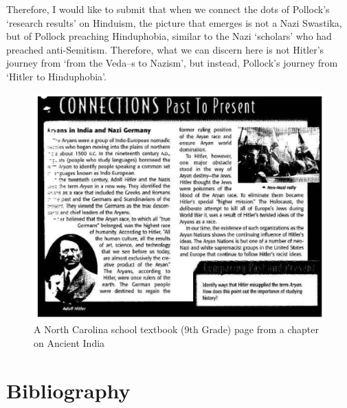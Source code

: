 Therefore, I would like to submit that when we connect the dots of Pollock’s ‘research results’ on Hinduism, the picture that emerges is not a Nazi Swastika, but of Pollock preaching Hinduphobia, similar to the Nazi ‘scholars’ who had preached anti-Semitism. Therefore, what we can discern here is not Hitler’s journey from ‘from the Veda--s to Nazism’, but instead, Pollock’s journey from ‘Hitler to Hinduphobia’.

\begin{figure}[!h]
\includegraphics[scale=.21]{images/chap8-1.jpg}
\caption{A North Carolina school textbook (9th Grade) page from a chapter on Ancient India}\label{chap8-fig1}
\end{figure}


\section*{Bibliography}

